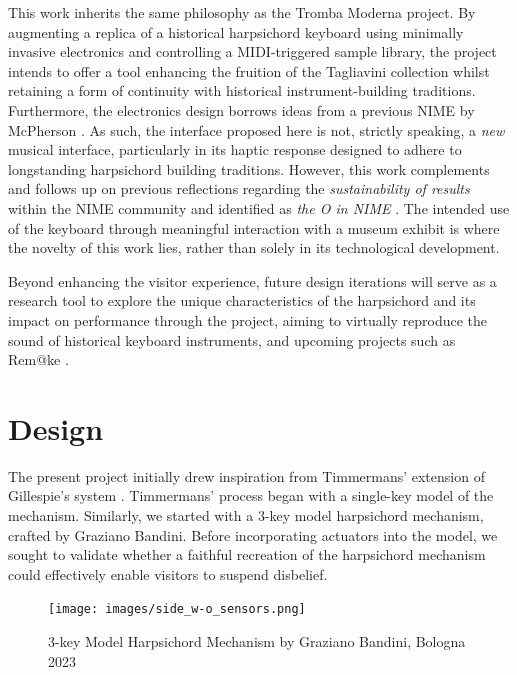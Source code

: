 This work inherits the same philosophy as the Tromba Moderna project. By augmenting a replica of a historical harpsichord keyboard using minimally invasive electronics and controlling a MIDI-triggered sample library, the project intends to offer a tool enhancing the fruition of the Tagliavini collection whilst retaining a form of continuity with historical instrument-building traditions. Furthermore, the electronics design borrows ideas from a previous NIME by McPherson \cite{McPherson2013}. As such, the interface proposed here is not, strictly speaking, a \emph{new} musical interface, particularly in its haptic response designed to adhere to longstanding harpsichord building traditions. However, this work complements and follows up on previous reflections regarding the \emph{sustainability of results} within the NIME community and identified as \emph{the O in NIME} \cite{Masu_NIME_2023}. The intended use of the keyboard through meaningful interaction with a museum exhibit is where the novelty of this work lies, rather than solely in its technological development. 

Beyond enhancing the visitor experience, future design iterations will serve as a research tool to explore the unique characteristics of the harpsichord and its impact on performance through the  project, aiming to virtually reproduce the sound of historical keyboard instruments, and upcoming projects such as Rem@ke \cite{remake1}.

\section{Design}\label{design}

The present project initially drew inspiration from Timmermans' extension of Gillespie’s system \cite{Timmermans2020, Gillespie1996}. Timmermans’ process began with a single-key model of the mechanism. Similarly, we started with a 3-key model harpsichord mechanism, crafted by Graziano Bandini. Before incorporating actuators into the model, we sought to validate whether a faithful recreation of the harpsichord mechanism could effectively enable visitors to suspend disbelief.

\begin{figure}  
  \centering
  \texttt{[image: images/side\_w-o\_sensors.png]} 
  \caption{3-key Model Harpsichord Mechanism by Graziano Bandini, Bologna 2023} 
  \label{fig:3key}
\end{figure}

